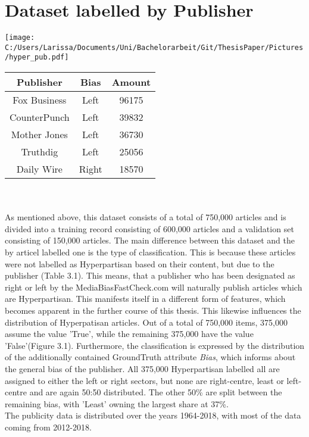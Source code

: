 \documentclass[a4paper, 11pt,titlepage,oneside,openany]{book}
\begin{document}
\section{Dataset labelled by Publisher}
\begin{minipage}[T]{.45\linewidth}
	\texttt{[image: C:/Users/Larissa/Documents/Uni/Bachelorarbeit/Git/ThesisPaper/Pictures/hyper\_pub.pdf]}
\end{minipage}
	\hspace{.1\linewidth}%
\begin{minipage}[T]{.45\linewidth}
	\centering
	\begin{tabular}{ccc}
		\toprule
		Publisher & Bias & Amount \\
		\midrule
		Fox Business & Left & 96175 \\
		CounterPunch & Left & 39832 \\
		Mother Jones & Left & 36730 \\
		Truthdig & Left & 25056 \\
		Daily Wire & Right & 18570 \\
		\bottomrule
	\end{tabular}
\end{minipage}\\
\\ As mentioned above, this dataset consists of a total of 750,000 articles and is divided into a training record consisting of 600,000 articles and a validation set consisting of 150,000 articles.
The main difference between this dataset and the by articel labelled one is the type of classification. This is because these articles were not labelled as Hyperpartisan based on their content, but due to the publisher (Table 3.1). This means, that a publisher who has been designated as right or left by the MediaBiasFastCheck.com will naturally publish articles which are Hyperpartisan. This manifests itself in a different form of features, which becomes apparent in the further course of this thesis. This likewise influences the distribution of Hyperpatisan articles.
 Out of a total of 750,000 items, 375,000 assume the value 'True', while the remaining 375,000 have the value 'False'(Figure 3.1). 
Furthermore, the classification is expressed by the distribution of the additionally contained GroundTruth attribute \textit{Bias}, which informs about the general bias of the publisher. All 375,000 Hyperpartisan labelled all are assigned to either the left or right sectors, but none are right-centre, least or left-centre and are again 50:50 distributed. The other 50\% are split between the remaining bias, with 'Least' owning the largest share at 37\%.\\
The publicity data is distributed over the years 1964-2018, with most of the data coming from 2012-2018.
\end{document}
